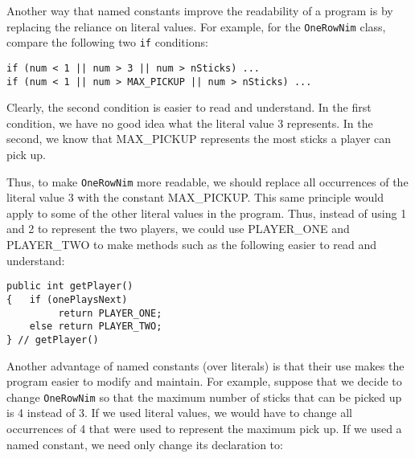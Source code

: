 
Another way that named constants improve the readability of a program
is by replacing the reliance on literal values.  For example, for the
{\tt OneRowNim} class, compare the following two {\tt if} conditions:

\begin{jjjlisting}
\begin{lstlisting}
if (num < 1 || num > 3 || num > nSticks) ...
if (num < 1 || num > MAX_PICKUP || num > nSticks) ...
\end{lstlisting}
\end{jjjlisting}

\noindent Clearly, the second condition is easier to read
and understand. In the first condition, we have no good idea what the
literal value 3 represents. In the second, we know that MAX\_PICKUP
represents the most sticks a player can pick up. 

Thus, to make {\tt OneRowNim} more readable, we should replace all
occurrences of the literal value 3 with the constant MAX\_PICKUP.
This same principle would apply to some of the other literal values in
the program.  Thus,
instead of using 1 and 2 to represent the two players, we could use
PLAYER\_ONE and PLAYER\_TWO to make methods such as the following
easier to read and understand:

\begin{jjjlisting}
\begin{lstlisting}
public int getPlayer()
{   if (onePlaysNext) 
         return PLAYER_ONE;
    else return PLAYER_TWO;
} // getPlayer()
\end{lstlisting}
\end{jjjlisting}


\noindent Another advantage of named constants (over literals) is that 
their use makes the program easier to modify and maintain. For
example, suppose that we decide to change {\tt OneRowNim} so that the
maximum number of sticks that can be picked up is 4 instead of 3.  If
we used literal values, we would have to change all occurrences of 4
that were used to represent the maximum pick up. If we used a named
constant, we need only change its declaration to:

